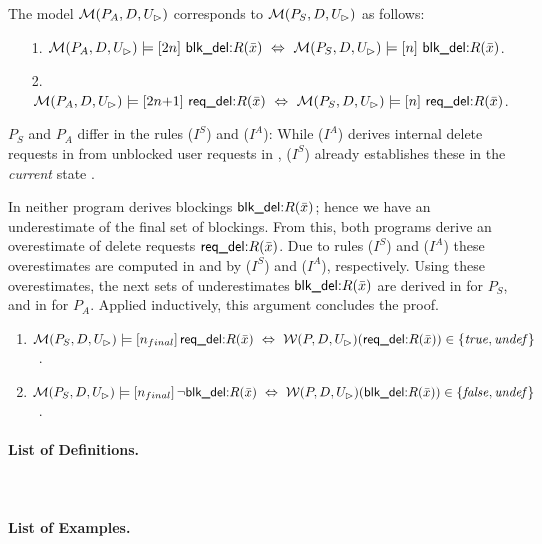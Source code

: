 \documentclass[twoside,11pt]{article}
\theoremstyle{lines}
\theoremstyle{longplain}
\def\rdel{\itorsf{req\_del:}}
\def\bdel{\itorsf{blk\_del:}}
\begin{document}
\begin{Lemma}\label{Lem:AFPStatelog}
The model $\mathcal M(P_A,D,U_\rhd)$ corresponds to $\mathcal M(P_S,D,U_\rhd)$
as follows:
\begin{itemize}
\item [1.]
  $\pl M(P_A,D,U_\rhd) \models \sterm{2n}\ \bdel R(\bar x) \Iff 
     \pl M(P_S,D,U_\rhd) \models \sterm{n}\ \bdel R(\bar x)$.
\item[2.]
  $\pl M(P_A,D,U_\rhd) \models \sterm{2n{+}1}\ \rdel R(\bar x) \Iff
     \pl M(P_S,D,U_\rhd) \models \sterm{n}\ \rdel R(\bar x)$.
\end{itemize}
\end{Lemma}
\begin{Proof} 
  $P_S$ and $P_A$ differ in the rules ($I^S$) and ($I^A$): While
  ($I^A$) derives internal delete requests in  from
  unblocked user requests in , ($I^S$) already establishes
  these in the \emph{current} state .

  In  neither program derives blockings $\bdel R(\bar x)$;
  hence we have an underestimate of the final set of blockings.  From
  this, both programs derive an overestimate of delete requests $\rdel
  R(\bar x)$. Due to rules ($I^S$) and ($I^A$) these overestimates are
  computed in  and  by ($I^S$) and ($I^A$),
  respectively.  Using these overestimates, the next sets of
  underestimates $\bdel R(\bar x)$ are derived in  for $P_S$,
  and in  for $P_A$.  Applied inductively, this argument
  concludes the proof.
\end{Proof}

\begin{Theorem}\label{gaga}
  \begin{enumerate}
  \item $\pl M(P_S,D,U_\rhd) \models \sterm{n_{final}}\, \rdel R(\bar x)  \ 
    \Leftrightarrow\ \pl W(P,D,U_\rhd)(\rdel R(\bar x)) \in
    \{\true,\undef\}$ ~.
  \item $\pl M(P_S,D,U_\rhd) \models \sterm{n_{final}}\, \neg \bdel
    R(\bar x) \ \Leftrightarrow\ \pl W(P,D,U_\rhd)(\bdel R(\bar x))
    \in \{\false,\undef\}$~.
  \end{enumerate}
\end{Theorem}
\makeatletter{}\makeatother
     
%
    {\begin{list}{}{}}
    {\item[##1 ##2:] ##3\dotfill~ ##4}%
    {\end{list}}

\paragraph{List of Definitions.}\
\theoremlisttype{allname}
\paragraph{List of Examples.}\
\listtheorems{Example}
\end{document}
